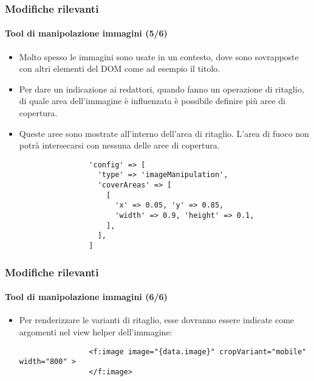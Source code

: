\begin{frame}[fragile]
	\frametitle{Modifiche rilevanti}
	\framesubtitle{Tool di manipolazione immagini (5/6)}

	\lstset{basicstyle=\tiny\ttfamily}

	\begin{itemize}
		\item Molto spesso le immagini sono usate in un contesto, dove sono sovrapposte con altri elementi del DOM come ad esempio il titolo.
		\item Per dare un indicazione ai redattori, quando fanno un operazione di ritaglio, di quale area dell'immagine è influenzata 
			è possibile definire più aree di copertura.
		\item Queste aree sono mostrate all'interno dell'area di ritaglio. L'area di fuoco non potrà intersecarsi con nessuna delle aree di copertura.

			\begin{lstlisting}
				'config' => [
				  'type' => 'imageManipulation',
				  'coverAreas' => [
				    [
				      'x' => 0.05, 'y' => 0.85,
				      'width' => 0.9, 'height' => 0.1,
				    ],
				  ],
				]
			\end{lstlisting}

	\end{itemize}

\end{frame}


\begin{frame}[fragile]
	\frametitle{Modifiche rilevanti}
	\framesubtitle{Tool di manipolazione immagini (6/6)}

	\lstset{basicstyle=\smaller\ttfamily}

	\begin{itemize}
		\item Per renderizzare le varianti di ritaglio, esse dovranno essere indicate come argomenti nel view helper dell'immagine:

			\begin{lstlisting}
				<f:image image="{data.image}" cropVariant="mobile" width="800" >
				</f:image>
			\end{lstlisting}

	\end{itemize}

\end{frame}

